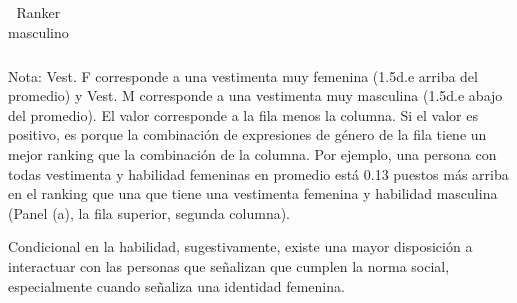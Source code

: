 \begin{table}[ht]
\begin{subtable}{\textwidth}
{\begin{tabular}{cccccc}
        \end{tabular}}
    \end{subtable}
    \begin{subtable}{\textwidth}
        \centering
        \vspace*{0.5cm}    
        \caption{Ranker masculino}
        \fontsize{9.5}{12}
    \end{subtable}
    \begin{threeparttable}
    \begin{tablenotes}
    \footnotesize{
    \item Nota: Vest. F corresponde a una vestimenta muy femenina (1.5d.e arriba del promedio) y Vest. M corresponde a una vestimenta muy masculina (1.5d.e abajo del promedio). El valor corresponde a la fila menos la columna. Si el valor es positivo, es porque la combinación de expresiones de género de la fila tiene un mejor ranking que la combinación de la columna. Por ejemplo, una persona con todas vestimenta y habilidad femeninas en promedio está 0.13 puestos más arriba en el ranking que una que tiene una vestimenta femenina y habilidad masculina (Panel (a), la fila superior, segunda columna).}
    \end{tablenotes}
    \end{threeparttable}
    \label{tab:hypothesis_tables}
\end{table}

\begin{result}
Condicional en la habilidad, sugestivamente, existe una mayor disposición a interactuar con las personas que señalizan que cumplen la norma social, especialmente cuando señaliza una identidad femenina. 
\end{result}

